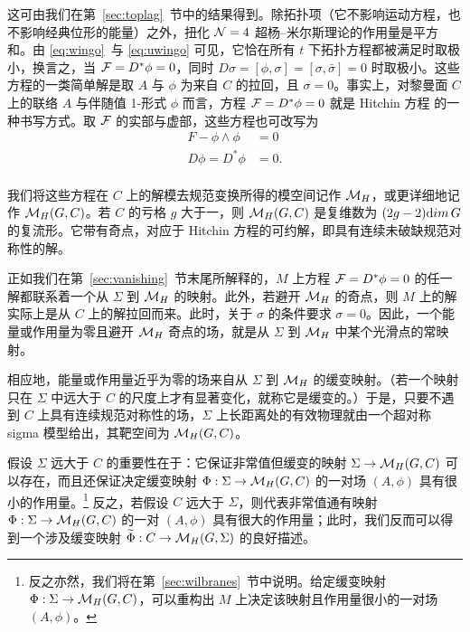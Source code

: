 这可由我们在第~\ref{sec:toplag}~节中的结果得到。除拓扑项（它不影响运动方程，也不影响经典位形的能量）之外，扭化 ${\EUN}=4$ 超杨--米尔斯理论的作用量是平方和。由 \eqref{eq:wingo}\ 与 \eqref{eq:uwingo} 可见，它恰在所有 $t$ 下拓扑方程都被满足时取极小，换言之，当 ${\cal F}=D^*\phi=0$，同时 $D\sigma=[\phi,\sigma]=[\sigma,\bar\sigma]=0$ 时取极小。这些方程的一类简单解是取 $A$ 与 $\phi$ 为来自 $C$ 的拉回，且 $\sigma=0$。事实上，对黎曼面 $C$ 上的联络 $A$ 与伴随值 1-形式 $\phi$ 而言，方程 ${\cal F}=D^*\phi=0$ 就是 Hitchin 方程 \cite{ref20} 的一种书写方式。取 ${\cal F}$ 的实部与虚部，这些方程也可改写为
\setcounter{equation}{0}
\begin{equation}\label{eq:zongo}
\begin{aligned} F-\phi\wedge\phi & = 0\\ D\phi=D^*\phi&=0
.\\\end{aligned}
\end{equation}

我们将这些方程在 $C$ 上的解模去规范变换所得的模空间记作 $\MH$，或更详细地记作 $\MH(G,C)$。若 $C$ 的亏格 $g$ 大于一，则 $\MH(G,C)$ 是复维数为 $(2g-2){\rm dim}\,G$ 的复流形。它带有奇点，对应于 Hitchin 方程的可约解，即具有连续未破缺规范对称性的解。

正如我们在第~\ref{sec:vanishing}~节末尾所解释的，$M$ 上方程 ${\cal F}=D^*\phi=0$ 的任一解都联系着一个从 $\Sigma$ 到 $\MH$ 的映射。此外，若避开 $\MH$ 的奇点，则 $M$ 上的解实际上是从 $C$ 上的解拉回而来。此时，关于 $\sigma$ 的条件要求 $\sigma=0$。因此，一个能量或作用量为零且避开 $\MH$ 奇点的场，就是从 $\Sigma$ 到 $\M_H$ 中某个光滑点的常映射。

相应地，能量或作用量近乎为零的场来自从 $\Sigma$ 到 $\M_H$ 的缓变映射。（若一个映射只在 $\Sigma$ 中远大于 $C$ 的尺度上才有显著变化，就称它是缓变的。）于是，只要不遇到 $C$ 上具有连续规范对称性的场，$\Sigma$ 上长距离处的有效物理就由一个超对称 sigma 模型给出，其靶空间为 $\M_H(G,C)$。

假设 $\Sigma$ 远大于 $C$ 的重要性在于：它保证非常值但缓变的映射 $\Sigma\to \MH(G,C)$ 可以存在，而且还保证决定缓变映射 $\Phi:\Sigma\to \MH(G,C)$ 的一对场 $(A,\phi)$ 具有很小的作用量。\footnote{反之亦然，我们将在第~\ref{sec:wilbranes}~节中说明。给定缓变映射 $\Phi:\Sigma\to \MH(G,C)$，可以重构出 $M$ 上决定该映射且作用量很小的一对场 $(A,\phi)$。} 反之，若假设 $C$ 远大于 $\Sigma$，则代表非常值通有映射 $\Phi:\Sigma\to \MH(G,C)$ 的一对 $(A,\phi)$ 具有很大的作用量；此时，我们反而可以得到一个涉及缓变映射 $\tilde\Phi:C\to \MH(G,\Sigma)$ 的良好描述。

